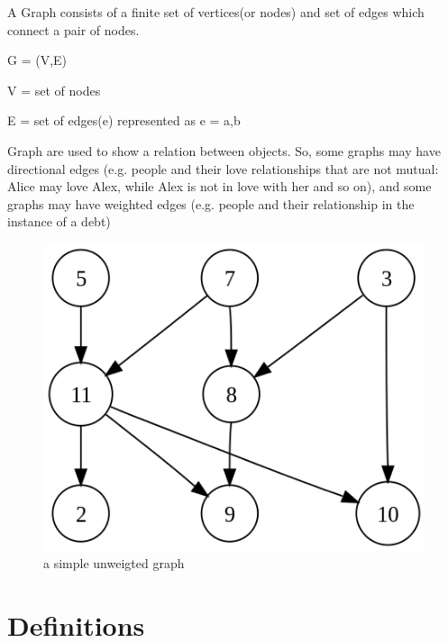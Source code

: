 \documentclass[12pt]{article}
\begin{document}
A Graph consists of a finite set of vertices(or nodes) and set of edges which connect a pair of nodes. 

G = (V,E)

V = set of nodes

E = set of edges(e) represented as e = {a,b}

Graph are used to show a relation between objects. So, some graphs may have directional edges (e.g. people and their love relationships that are not mutual: Alice may love Alex, while Alex is not in love with her and so on), and some graphs may have weighted edges (e.g. people and their relationship in the instance of a debt)

\begin{figure}[h]
\centering
  \includegraphics[width=\linewidth/2]{458px-Directed_acyclic_graph_2.png}
  
\caption{a simple unweigted graph}
\end{figure}

\section{Definitions}
\end{document}
